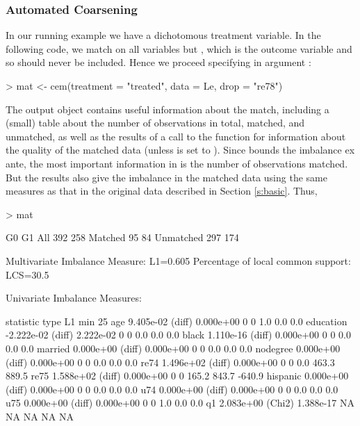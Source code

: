 \documentclass[article]{jss}
\begin{document}
\subsubsection{Automated Coarsening}\label{s:cem-auto}

In our running example we have a dichotomous treatment variable.  In
the following code, we match on all variables but , which
is the outcome variable and so should never be included.  Hence we
proceed specifying  in argument :

\begin{Schunk}
\begin{Sinput}
> mat <- cem(treatment = "treated", data = Le, drop = "re78")
\end{Sinput}
\end{Schunk}
%
The output object  contains useful information about the
match, including a (small) table about the number of observations in
total, matched, and unmatched, as well as the results of a call to the
 function for information about the quality of the
matched data (unless  is set to ).
Since  bounds the imbalance ex ante, the most important
information in  is the number of observations matched.  But
the results also give the imbalance in the matched data using the same
measures as that in the original data described in Section
\ref{s:basic}.  Thus,

\begin{Schunk}
\begin{Sinput}
> mat
\end{Sinput}
\begin{Soutput}
           G0  G1
All       392 258
Matched    95  84
Unmatched 297 174


Multivariate Imbalance Measure: L1=0.605
Percentage of local common support: LCS=30.5%

Univariate Imbalance Measures:

           statistic   type        L1 min 25%
age        9.405e-02 (diff) 0.000e+00   0   0   1.0   0.0    0.0
education -2.222e-02 (diff) 2.222e-02   0   0   0.0   0.0    0.0
black      1.110e-16 (diff) 0.000e+00   0   0   0.0   0.0    0.0
married    0.000e+00 (diff) 0.000e+00   0   0   0.0   0.0    0.0
nodegree   0.000e+00 (diff) 0.000e+00   0   0   0.0   0.0    0.0
re74       1.496e+02 (diff) 0.000e+00   0   0   0.0 463.3  889.5
re75       1.588e+02 (diff) 0.000e+00   0   0 165.2 843.7 -640.9
hispanic   0.000e+00 (diff) 0.000e+00   0   0   0.0   0.0    0.0
u74        0.000e+00 (diff) 0.000e+00   0   0   0.0   0.0    0.0
u75        0.000e+00 (diff) 0.000e+00   0   0   1.0   0.0    0.0
q1         2.083e+00 (Chi2) 1.388e-17  NA  NA    NA    NA     NA
\end{Soutput}
\end{Schunk}
\end{document}

